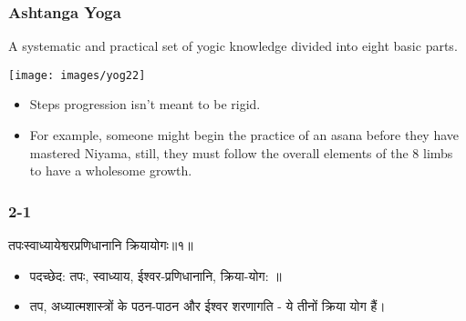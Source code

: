 \begin{frame}[fragile]\frametitle{Ashtanga  Yoga}

A systematic and practical set of yogic knowledge divided into eight basic parts.

\begin{center}
\texttt{[image: images/yog22]}
\end{center}

		\begin{itemize}
		\item Steps progression isn’t meant to be rigid. 
		\item For example, someone might begin the practice of an asana before they have mastered Niyama, still, they must follow the overall elements of the 8 limbs to have a wholesome growth.
		\end{itemize}
		
\end{frame}


\begin{frame}[fragile]\frametitle{2-1}
\begin{sanskrit}
तपःस्वाध्यायेश्वरप्रणिधानानि क्रियायोगः॥१॥
\end{sanskrit}

\begin{itemize}
\item पदच्छेद: तपः, स्वाध्याय, ईश्वर-प्रणिधानानि, क्रिया-योग: ॥
\item तप, अध्यात्मशास्त्रों के पठन-पाठन और ईश्वर शरणागति - ये तीनों क्रिया योग हैं।
\end{itemize}
	
\end{frame}

